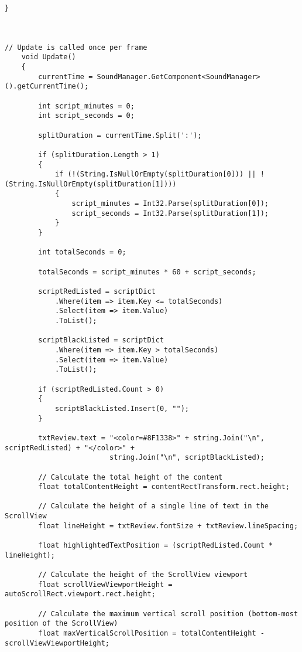 \begin{lstlisting}[caption=Codice sorgente dello script \textit{ScriptManager}, label=lst:ScriptManagerScript, captionpos=b, basicstyle=\scriptsize]
    }



// Update is called once per frame
    void Update()
    {
        currentTime = SoundManager.GetComponent<SoundManager>().getCurrentTime();

        int script_minutes = 0;
        int script_seconds = 0;

        splitDuration = currentTime.Split(':');

        if (splitDuration.Length > 1)
        {
            if (!(String.IsNullOrEmpty(splitDuration[0])) || !(String.IsNullOrEmpty(splitDuration[1])))
            {
                script_minutes = Int32.Parse(splitDuration[0]);
                script_seconds = Int32.Parse(splitDuration[1]);
            }
        }

        int totalSeconds = 0;

        totalSeconds = script_minutes * 60 + script_seconds;

        scriptRedListed = scriptDict
            .Where(item => item.Key <= totalSeconds)
            .Select(item => item.Value)
            .ToList();

        scriptBlackListed = scriptDict
            .Where(item => item.Key > totalSeconds)
            .Select(item => item.Value)
            .ToList();

        if (scriptRedListed.Count > 0)
        {
            scriptBlackListed.Insert(0, "");
        }

        txtReview.text = "<color=#8F1338>" + string.Join("\n", scriptRedListed) + "</color>" +
                         string.Join("\n", scriptBlackListed);

        // Calculate the total height of the content
        float totalContentHeight = contentRectTransform.rect.height;

        // Calculate the height of a single line of text in the ScrollView
        float lineHeight = txtReview.fontSize + txtReview.lineSpacing;

        float highlightedTextPosition = (scriptRedListed.Count * lineHeight);

        // Calculate the height of the ScrollView viewport
        float scrollViewViewportHeight = autoScrollRect.viewport.rect.height;

        // Calculate the maximum vertical scroll position (bottom-most position of the ScrollView)
        float maxVerticalScrollPosition = totalContentHeight - scrollViewViewportHeight;


\end{lstlisting}
